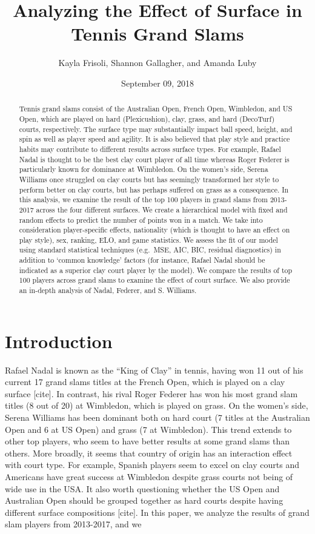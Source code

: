\documentclass[]{article}
\title{Analyzing the Effect of Surface in Tennis Grand Slams}
\author{Kayla Frisoli, Shannon Gallagher, and Amanda Luby}
\date{September 09, 2018}
\begin{document}
\maketitle
\begin{abstract}
Tennis grand slams consist of the Australian Open, French Open,
Wimbledon, and US Open, which are played on hard (Plexicushion), clay,
grass, and hard (DecoTurf) courts, respectively. The surface type may
substantially impact ball speed, height, and spin as well as player
speed and agility. It is also believed that play style and practice
habits may contribute to different results across surface types. For
example, Rafael Nadal is thought to be the best clay court player of all
time whereas Roger Federer is particularly known for dominance at
Wimbledon. On the women's side, Serena Williams once struggled on clay
courts but has seemingly transformed her style to perform better on clay
courts, but has perhaps suffered on grass as a consequence. In this
analysis, we examine the result of the top 100 players in grand slams
from 2013-2017 across the four different surfaces. We create a
hierarchical model with fixed and random effects to predict the number
of points won in a match. We take into consideration player-specific
effects, nationality (which is thought to have an effect on play style),
sex, ranking, ELO, and game statistics. We assess the fit of our model
using standard statistical techniques (e.g.~MSE, AIC, BIC, residual
diagnostics) in addition to `common knowledge' factors (for instance,
Rafael Nadal should be indicated as a superior clay court player by the
model). We compare the results of top 100 players across grand slams to
examine the effect of court surface. We also provide an in-depth
analysis of Nadal, Federer, and S. Williams.
\end{abstract}

{
\setcounter{tocdepth}{2}
\tableofcontents
}
\section{Introduction}\label{sec:iintro}

Rafael Nadal is known as the ``King of Clay'' in tennis, having won 11
out of his current 17 grand slams titles at the French Open, which is
played on a clay surface {[}cite{]}. In contrast, his rival Roger
Federer has won his most grand slam titles (8 out of 20) at Wimbledon,
which is played on grass. On the women's side, Serena Williams has been
dominant both on hard court (7 titles at the Australian Open and 6 at US
Open) and grass (7 at Wimbledon). This trend extends to other top
players, who seem to have better results at some grand slams than
others. More broadly, it seems that country of origin has an interaction
effect with court type. For example, Spanish players seem to excel on
clay courts and Americans have great success at Wimbledon despite grass
courts not being of wide use in the USA. It also worth questioning
whether the US Open and Australian Open should be grouped together as
hard courts despite having different surface compositions {[}cite{]}. In
this paper, we analyze the results of grand slam players from 2013-2017,
and we
\end{document}
